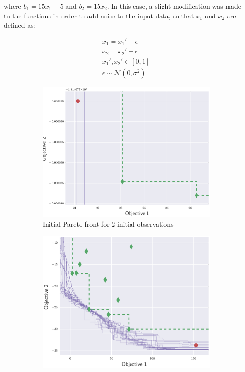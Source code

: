 \documentclass{article}
\begin{document}
where $b_1 = 15x_1 - 5$ and $b_2 = 15x_2$. In this case, a slight modification was made to the functions in order to add noise to the input data, so that $x_1$ and $x_2$ are defined as:

\begin{align*}
    x_1 = x_1' + \epsilon\\
    x_2 = x_2' + \epsilon\\
    x_1', x_2' \in \left[0,1\right]\\
    \epsilon \sim \mathcal{N}(0,\sigma^2)
\end{align*}

\begin{figure}[!t]
\centering
    \begin{subfigure}{0.45\textwidth}
        \includegraphics[width=\textwidth]{li_ex1_00}
        \caption{Initial Pareto front for 2 initial observations}
        \label{li_initial}
    \end{subfigure}
    \hfill
    \begin{subfigure}{0.45\textwidth}
        \includegraphics[width=\textwidth]{hi_ex1_00}

\end{subfigure}
\end{figure}
\end{document}

